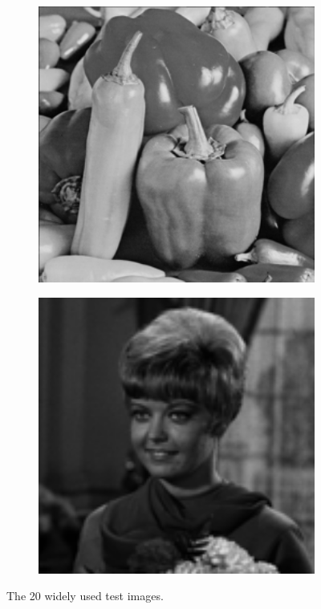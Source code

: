 \begin{figure}
\begin{subfigure}[b]{0.09\textwidth}
    \end{subfigure}
    \hfill
    \begin{subfigure}[b]{0.09\textwidth}
        \centering
        \includegraphics[width=1\textwidth]{images/pgpd/peppers.png}
    \end{subfigure}
    \hfill
    \begin{subfigure}[b]{0.09\textwidth}
        \centering
        \includegraphics[width=1\textwidth]{images/pgpd/zelda.png}
    \end{subfigure}
    \caption{The 20 widely used test images.}
    \label{fig5}
\end{figure}


